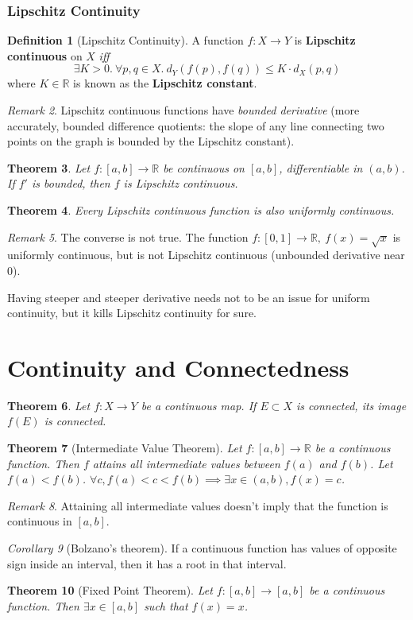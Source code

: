 \documentclass[a4paper,12pt]{report}
\newcommand{\R}{\mathbb{R}}
\newcommand{\tb}{\textbf}
\theoremstyle{plain}
\newtheorem{theorem}{\color{blue}Theorem}[chapter] %
\theoremstyle{definition}
\newtheorem{definition}[theorem]{\color{red}Definition} %
\theoremstyle{remark}
\newtheorem{remark}[theorem]{\color{ForestGreen}Remark} %
\newtheorem{corollary}[theorem]{\color{SkyBlue}Corollary} %
\begin{document}
\subsubsection{Lipschitz Continuity}
\begin{definition}[Lipschitz Continuity]
A function $f:X\to Y$ is \tb{Lipschitz continuous} on $X$ \emph{iff}
\[
\exists K>0.\:\forall p,q\in X.\: d_Y(f(p),f(q))\le K\cdot d_X(p,q)
\]
where $K\in\R$ is known as the \tb{Lipschitz constant}.
\end{definition}
\begin{remark}
Lipschitz continuous functions have \emph{bounded derivative} (more accurately, bounded difference quotients: the slope of any line connecting two points on the graph is bounded by the Lipschitz constant).
\end{remark}
\begin{theorem}
Let $f:[a,b]\to\R$ be continuous on $[a,b]$, differentiable in $(a,b)$. If $f'$ is bounded, then $f$ is Lipschitz continuous.
\end{theorem}
\begin{theorem}
Every Lipschitz continuous function is also uniformly continuous.
\end{theorem}
\begin{remark}
The converse is not true. The function $f:[0,1]\to\R,\: f(x)=\sqrt{x}$ is uniformly continuous, but is not Lipschitz continuous (unbounded derivative near $0$).
\end{remark}
\begin{insight}
Having steeper and steeper derivative needs not to be an issue for uniform continuity, but it kills Lipschitz continuity for sure.
\end{insight}

\section{Continuity and Connectedness}
\begin{theorem}
Let $f:X\to Y$ be a continuous map. If $E\subset X$ is connected, its image $f(E)$ is connected.
\end{theorem}
\begin{theorem}[Intermediate Value Theorem]
Let $f:[a,b]\to\R$ be a continuous function. Then $f$ attains all intermediate values between $f(a)$ and $f(b)$. Let $f(a)<f(b)$. $\forall c, f(a)<c<f(b)\implies\exists x\in(a,b), f(x)=c$.
\end{theorem}
\begin{remark}
Attaining all intermediate values doesn't imply that the function is continuous in $[a,b]$.
\end{remark}
\begin{corollary}[Bolzano's theorem]
If a continuous function has values of opposite sign inside an interval, then it has a root in that interval.
\end{corollary}
\begin{theorem}[Fixed Point Theorem]
Let $f:[a,b]\to [a,b]$ be a continuous function. Then $\exists x\in [a,b]$ such that $f(x)=x$.
\end{theorem}
\end{document}
